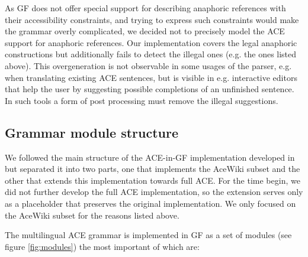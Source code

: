 \documentclass[a4paper]{article}
\begin{document}
As GF does not offer special support for describing anaphoric references
with their accessibility constraints, and trying to express such constraints
would make the grammar overly complicated,
we decided not to precisely model the ACE support for anaphoric references.
Our implementation covers the legal anaphoric constructions but additionally
fails to detect the illegal ones (e.g. the ones listed above). This
overgeneration is not observable in some usages of the parser, e.g. when
translating existing ACE sentences, but is visible in e.g. interactive editors
that help the user by suggesting possible completions of an unfinished
sentence. In such tools a form of post processing must remove the illegal
suggestions.

\subsection{Grammar module structure}

We followed the main structure of the ACE-in-GF implementation developed
in \cite{ranta:cnl2009_revised} but separated it into two parts, one that
implements the AceWiki subset and the other that extends this implementation
towards full ACE. For the time begin, we did not further develop the full ACE
implementation,
so the extension serves only as a placeholder that preserves the
original \cite{ranta:cnl2009_revised} implementation. We only focused on the
AceWiki subset for the reasons listed above.

The multilingual ACE grammar is implemented in GF as a set of modules
(see figure \ref{fig:modules}) the most important of which are:
\end{document}

